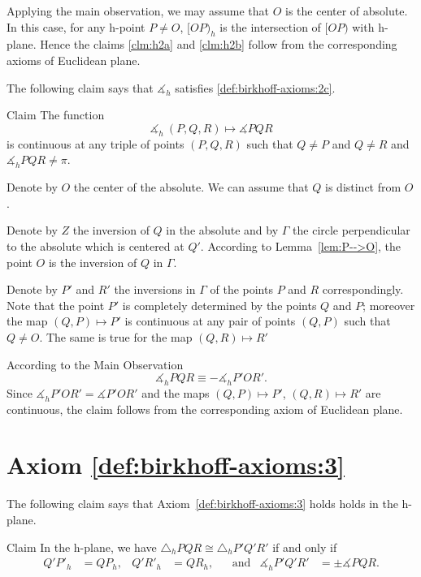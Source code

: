 Applying the main observation, 
we may assume that $O$ is the center of absolute.
In this case, for any h-point $P\ne O$,
$[OP)_h$ is the intersection of $[OP)$ with h-plane.
Hence the claims \ref{clm:h2a} and \ref{clm:h2b} 
follow from the corresponding axioms of Euclidean plane.
\qeds

The following claim says that
$\measuredangle_h$ satisfies
 \ref{def:birkhoff-axioms:2c}.

\begin{thm}{Claim}\label{clm:h2c}
The function 
$$\measuredangle_h\:(P,Q,R)\mapsto\measuredangle P Q R$$
is continuous at any triple of points $(P,Q,R)$
such that $Q\ne P$ and $Q\ne R$ and $\measuredangle_h P Q R\ne\pi$.
\end{thm}

Denote by $O$ the center of the absolute.
We can assume that $Q$ is distinct from $O$.

Denote by $Z$ the inversion of $Q$ in the absolute
and by $\Gamma$ the circle perpendicular to the absolute which is centered at $Q'$.
According to Lemma~\ref{lem:P-->O},
the point $O$ is the inversion of $Q$ in $\Gamma$.

Denote by $P'$ and $R'$ the inversions in $\Gamma$ of the points $P$ and $R$ correspondingly.
Note that the point $P'$ is completely determined by the points $Q$ and $P$;
moreover the map $(Q,P)\mapsto P'$ is continuous at any pair of points $(Q,P)$ such that $Q\ne O$.
The same is true for the map $(Q,R)\mapsto R'$

According to the Main Observation 
$$\measuredangle_h P Q R\equiv -\measuredangle_h P' O R'.$$
Since $\measuredangle_h P' O R'=\measuredangle P' O R'$ and 
the maps $(Q,P)\mapsto P'$, $(Q,R)\mapsto R'$ are continuous,
the claim follows from the corresponding axiom of Euclidean plane.
\qeds

\section*{Axiom \ref{def:birkhoff-axioms:3}}

The following claim says that Axiom~\ref{def:birkhoff-axioms:3} holds holds in the h-plane.

\begin{thm}{Claim}
In the h-plane, we have
$\triangle_h P Q R 
\cong
\triangle_h P' Q' R'$
if and only if 
\begin{align*}
Q' P'_h&=Q P_h, & Q' R'_h&= Q R_h, &&\text{and}
&\measuredangle_h P' Q' R'&=\pm\measuredangle P Q R.
\end{align*}
 
\end{thm}

